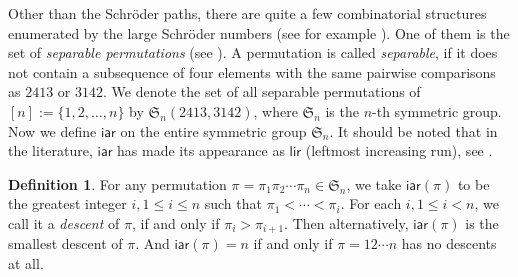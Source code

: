 \documentclass[11pt,reqno]{amsart}
\numberwithin{equation}{section}
\theoremstyle{plain}
\theoremstyle{definition}
\newtheorem{Def}[theorem]{Definition}
\def\iar{\mathsf{iar}}
\def\lir{\mathsf{lir}}
\begin{document}
Other than the Schr\"oder paths, there are quite a few combinatorial structures enumerated by the large Schr\"oder numbers (see for example \cite[Exercise 6.39]{StaEC2}). One of them is the set of \emph{separable permutations} (see \cite{SS,Wes,Kit}). A permutation is called \emph{separable}, if it does not contain a subsequence of four elements with the same pairwise comparisons as $2413$ or $3142$. We denote the set of all separable permutations of $[n]:=\{1,2,\ldots,n\}$ by $\mathfrak{S}_{n}(2413,3142)$, where $\mathfrak{S}_n$ is the $n$-th symmetric group. Now we define $\iar$ on the entire symmetric group $\mathfrak{S}_n$. It should be noted that in the literature, $\iar$ has made its appearance as $\lir$ (leftmost increasing run), see \cite[pp. 5]{CK}.

\begin{Def}
For any permutation $\pi=\pi_1\pi_2\cdots\pi_n\in\mathfrak{S}_n$, we take $\iar(\pi)$ to be the greatest integer $i, 1\le i\le n$ such that $\pi_1<\cdots<\pi_{i}$. For each $i, 1\le i< n$, we call it a \emph{descent} of $\pi$, if and only if $\pi_i>\pi_{i+1}$. Then alternatively, $\iar(\pi)$ is the smallest descent of $\pi$. And $\iar(\pi)=n$ if and only if $\pi=12\cdots n$ has no descents at all.
\end{Def}
\end{document}
